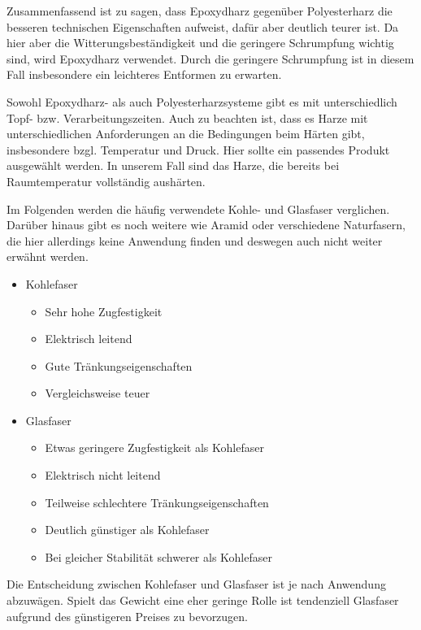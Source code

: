 \documentclass[12pt, a4paper, ngerman]{article}
\begin{document}
Zusammenfassend ist zu sagen, dass Epoxydharz gegenüber Polyesterharz die besseren technischen Eigenschaften aufweist, dafür aber deutlich teurer ist. Da hier aber die Witterungsbeständigkeit und die geringere Schrumpfung wichtig sind, wird Epoxydharz verwendet. Durch die geringere Schrumpfung ist in diesem Fall insbesondere ein leichteres Entformen zu erwarten.

Sowohl Epoxydharz- als auch Polyesterharzsysteme gibt es mit unterschiedlich Topf- bzw. Verarbeitungszeiten. Auch zu beachten ist, dass es Harze mit unterschiedlichen Anforderungen an die Bedingungen beim Härten gibt, insbesondere bzgl. Temperatur und Druck. Hier sollte ein passendes Produkt ausgewählt werden. In unserem Fall sind das Harze, die bereits bei Raumtemperatur vollständig aushärten.

Im Folgenden werden die häufig verwendete Kohle- und Glasfaser verglichen. Darüber hinaus gibt es noch weitere wie Aramid oder verschiedene Naturfasern, die hier allerdings keine Anwendung finden und deswegen auch nicht weiter erwähnt werden.

\begin{itemize}
	\item Kohlefaser
	\begin{itemize}
		\item Sehr hohe Zugfestigkeit
		\item Elektrisch leitend
		\item Gute Tränkungseigenschaften
		\item Vergleichsweise teuer
	\end{itemize}
	\item Glasfaser
	\begin{itemize}
		\item Etwas geringere Zugfestigkeit als Kohlefaser
		\item Elektrisch nicht leitend
		\item Teilweise schlechtere Tränkungseigenschaften
		\item Deutlich günstiger als Kohlefaser
		\item Bei gleicher Stabilität schwerer als Kohlefaser
	\end{itemize}
\end{itemize}

Die Entscheidung zwischen Kohlefaser und Glasfaser ist je nach Anwendung abzuwägen. Spielt das Gewicht eine eher geringe Rolle ist tendenziell Glasfaser aufgrund des günstigeren Preises zu bevorzugen.

\end{document}
